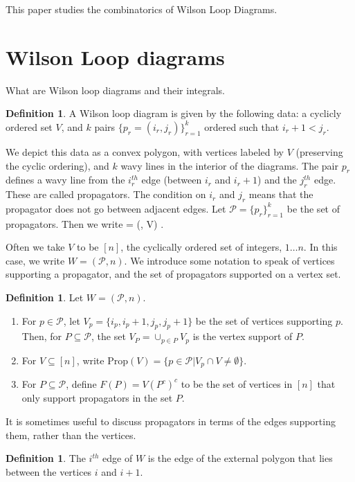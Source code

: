 \documentclass[11pt]{article}
\def\bas #1\eas{\begin{align*} #1 \end{align*}}
\newcommand{\cP}{\mathcal{P}}
\newcommand{\Prop}{\textrm{Prop}}
\theoremstyle{remark}
\theoremstyle{definition}
\newtheorem{dfn}[thm]{Definition}
\begin{document}
This paper studies the combinatorics of Wilson Loop Diagrams.
\section{Wilson Loop diagrams}

What are Wilson loop diagrams and their integrals.

\begin{dfn}\label{WLdfn}
A Wilson loop diagram is given by the following data: a cyclicly ordered set $V$, and $k$ pairs $\{p_r = (i_r, j_r)\}_{r=1}^k$ ordered such that $i_r +1 < j_r$. \end{dfn}

We depict this data as a convex polygon, with vertices labeled by $V$ (preserving the cyclic ordering), and $k$ wavy lines in the interior of the diagrams. The pair $p_r$ defines a wavy line from the $i_r^{th}$ edge (between $i_r$ and $i_r+1$) and the $j_r^{th}$ edge. These are called propagators.  The condition on $i_r$ and $j_r$ means that the propagator does not go between adjacent edges. Let $\cP = \{p_r\}_{r=1}^k$ be the set of propagators. Then we write \bas W = (\cP, V) \;.\eas

Often we take $V$ to be $[n]$, the cyclically ordered set of integers, $1 \ldots n$. In this case, we write $W = (\cP, n)$. We introduce some notation to speak of vertices supporting a propagator, and the set of propagators supported on a vertex set.

\begin{dfn} \label{VPropdfn}
Let $W = (\cP, n)$.
\begin{enumerate}
\item For $p \in \cP$, let $V_p = \{i_p, i_p+1, j_p, j_p+1\}$ be the set of vertices supporting $p$. Then, for $P \subseteq \cP$, the set $V_P = \cup_{p \in P} V_p$ is the vertex support of $P$.
\item For $V \subseteq [n]$, write $\Prop(V) = \{ p \in \cP | V_p \cap V \neq \emptyset \} $.
\item For $P \subseteq \cP$, define $F(P) = V(P^c)^c$ to be the set of vertices in $[n]$ that only support propagators in the set $P$. 
\end{enumerate}
\end{dfn}

It is sometimes useful to discuss propagators in terms of the edges supporting them, rather than the vertices. 

\begin{dfn}
The $i^{th}$ edge of $W$ is the edge of the external polygon that lies between the vertices $i$ and $i+1$. 
\end{dfn}
\end{document}
